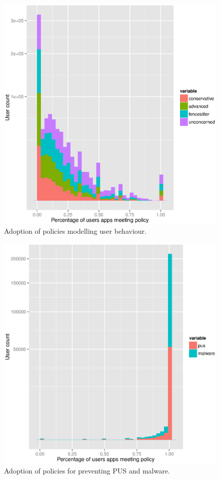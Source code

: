 \documentclass[twocolumn,letterpaper]{soups-poster}
\begin{document}
\begin{figure}[!ht]
  \includegraphics[width=\linewidth]{./tables/lin.eps}
  \caption{Adoption of policies modelling user behaviour.}
  \label{fig:lin}
\end{figure}

\begin{figure}[!ht]
  \includegraphics[width=\linewidth]{./tables/malware.eps}
  \caption{Adoption of policies for preventing PUS and malware.}
  \label{fig:malware}
\end{figure}
\end{document}
